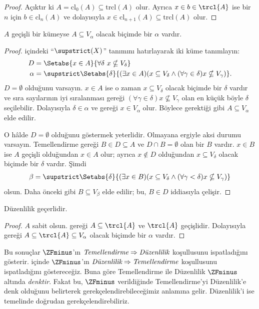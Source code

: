 \documentclass[../../../include/open-logic-section]{subfiles}
\begin{document}
\begin{proof}
Açıktır ki $A=\text{cl}_0(A)\subseteq\text{trcl}(A)$ olur. Ayrıca
$x\in b\in\trcl{A}$ ise bir $n$ için $b\in\text{cl}_n(A)$ ve dolayısıyla
$x\in\text{cl}_{n+1}(A)\subseteq\text{trcl}(A)$ olur.
\end{proof}

\begin{lem}
$A$ geçişli bir kümeyse $A\subseteq V_\alpha$ olacak biçimde bir $\alpha$
vardır.
\end{lem}

\begin{proof}
 içindeki ``$\supstrict(X)$'' tanımını
hatırlayarak iki küme tanımlayın:
\begin{align*}
	D  &= \Setabs{x \in A}{\forall \delta\ x \nsubseteq V_\delta}\\
	\alpha &= \supstrict\Setabs{\delta}{(\exists x \in A)
	(x \subseteq V_\delta \land (\forall \gamma \in \delta)x \nsubseteq V_\gamma)}.
\end{align*}
$D=\emptyset$ olduğunu varsayın. $x\in A$ ise o zaman
$x\subseteq V_\delta$ olacak biçimde bir $\delta$ vardır ve sıra sayılarının
iyi sıralanması gereği
$(\forall\gamma\in\delta)x\nsubseteq V_\gamma$ olan en küçük böyle
$\delta$ seçilebilir. Dolayısıyla $\delta\in\alpha$ ve
 gereği $x\in V_\alpha$ olur.
Böylece gerektiği gibi $A\subseteq V_\alpha$ elde edilir.

O hâlde $D=\emptyset$ olduğunu göstermek yeterlidir. Olmayana ergiyle aksi
durumu varsayın. Temellendirme gereği
$B\in D\subseteq A$ ve $D\cap B=\emptyset$ olan bir $B$ vardır.
$x\in B$ ise $A$ geçişli olduğundan $x\in A$ olur; ayrıca $x\notin D$
olduğundan $x\subseteq V_\delta$ olacak biçimde bir $\delta$ vardır. Şimdi
\[
	\beta = \supstrict\Setabs{\delta}{(\exists x \in B)(x \subseteq V_\delta \land (\forall \gamma < \delta)x \nsubseteq V_\gamma)}
\]
olsun. Daha önceki gibi $B\subseteq V_\beta$ elde edilir; bu, $B\in D$
iddiasıyla çelişir.
\end{proof}

\begin{thm}
Düzenlilik geçerlidir.
\end{thm}

\begin{proof}
$A$ sabit olsun.  gereği
$A\subseteq\trcl{A}$ ve $\trcl{A}$ geçişlidir. Dolayısıyla
 gereği
$A\subseteq\trcl{A}\subseteq V_\alpha$ olacak biçimde bir $\alpha$ vardır.
\end{proof}

Bu sonuçlar $\ZFminus$'ın
$\emph{Temellendirme}\Rightarrow\emph{Düzenlilik}$ koşullusunu
ispatladığını gösterir. 
içinde $\ZFminus$'ın
$\emph{Düzenlilik}\Rightarrow\emph{Temellendirme}$ koşullusunu
ispatladığını göstereceğiz. Buna göre Temellendirme ile Düzenlilik
$\ZFminus$ altında \emph{denktir}. Fakat bu, $\ZFminus$ verildiğinde
Temellendirme'yi Düzenlilik'e denk olduğunu belirterek
gerekçelendirebileceğimiz anlamına gelir. Düzenlilik'i ise
\stageshier{} temelinde doğrudan gerekçelendirebiliriz.
\end{document}
